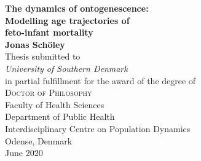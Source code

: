 \documentclass[
  10pt, twoside
]{book}
\begin{document}
\begin{titlepage}
\begin{center}
{\huge\bfseries The dynamics of ontogenescence: \\ Modelling age trajectories of \\ feto-infant mortality\\}
  \vspace{1.5cm}
{\Large\bfseries Jonas Schöley}\\[5pt]
  \vspace{2cm}
{Thesis  submitted to} \\[5pt]
\emph{{University of Southern Denmark}}\\[2cm]
{in partial fulfillment for the award of the degree
  of} \\[2cm]
\textsc{\Large{{Doctor of Philosophy}}} \\[5pt]
\vfill
{Faculty of Health Sciences}\\[5pt]
{Department of Public Health}\\[5pt]
{Interdisciplinary Centre on Population Dynamics}\\
\vfill
{Odense, Denmark}\\[5pt]
{June 2020}
\end{center}
\end{titlepage}


\end{document}
